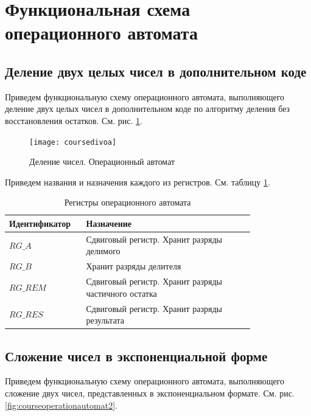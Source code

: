 \documentclass[a4paper,14pt]{extarticle}
\begin{document}
\section{Функциональная схема операционного автомата}
\subsection{Деление двух целых чисел в дополнительном коде}
Приведем функциональную схему операционного автомата, выполняющего деление двух целых чисел в дополнительном коде по алгоритму деления без восстановления остатков. См. рис. \ref{fig:courseoperationautomat}.

\begin{figure}[htp]
	\centering
	\texttt{[image: coursedivoa]}
	\caption{Деление чисел. Операционный автомат}
	\label{fig:courseoperationautomat}
\end{figure}


Приведем названия и назначения каждого из регистров. См. таблицу \ref{tab:course_op1_regs}.
\begin{table}[h!]
	\centering
	\small
	\begin{tabular}{|m{0.2\linewidth}|m{0.6\linewidth}|}
		\hline
		\textbf{Идентификатор} & \textbf{Назначение} \\ \hline
		$RG\_A$ & Сдвиговый регистр. Хранит разряды делимого \\ \hline
		$RG\_B$ & Хранит разряды делителя \\ \hline
		$RG\_REM$ & Сдвиговый регистр. Хранит разряды частичного остатка \\ \hline
		$RG\_RES$ & Сдвиговый регистр. Хранит разряды результата \\ \hline
	\end{tabular}
	\caption{Регистры операционного автомата}
	\label{tab:course_op1_regs}
\end{table}
\newpage
\subsection{Сложение чисел в экспоненциальной форме}

Приведем функциональную схему операционного автомата, выполняющего сложение двух чисел, представленных в экспоненциальном формате. См. рис. \ref{fig:courseoperationautomat2}.
\end{document}
